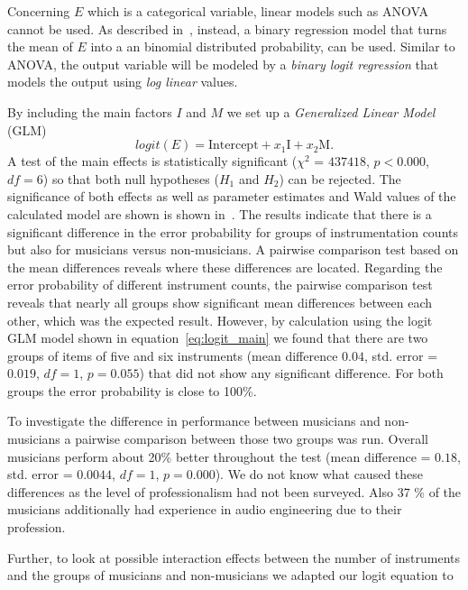 \par
Concerning $E$ which is a categorical variable, linear models such as ANOVA cannot be used.
As described in~\cite{jaeger08}, instead, a binary regression model that turns the mean of $E$ into a an binomial distributed probability, can be used.
Similar to ANOVA, the output variable will be modeled by a \emph{binary logit regression} that models the output using \emph{log linear} values.
\par
By including the main factors $I$ and $M$ we set up a \emph{Generalized Linear Model} (GLM)
\begin{equation}
	logit(E) =  \text{Intercept} + x_1 \text{I} + x_2 \text{M} .
	\label{eq:logit_main}
\end{equation}
A test of the main effects is statistically significant ($\chi^2$ = $437418$, $p < 0.000$, $df = 6$) so that both null hypotheses ($H_1$ and $H_2$) can be rejected. The significance of both effects as well as parameter estimates and Wald values of the calculated model are shown is shown in~\cite{stoeter13}.
The results indicate that there is a significant difference in the error probability for groups of instrumentation counts but also for musicians versus non-musicians. A pairwise comparison test based on the mean differences reveals where these differences are located. Regarding the error probability of different instrument counts, the pairwise comparison test reveals that nearly all groups show significant mean differences between each other, which was the expected result. However, by calculation using the logit GLM model shown in equation~\ref{eq:logit_main} we found that there are two groups of items of five and six instruments (mean difference $0.04$, std. error = $0.019$, $df = 1$, $p = 0.055$) that did not show any significant difference. For both groups the error probability is close to 100\%.
\par
To investigate the difference in performance between musicians and non-musicians a pairwise comparison between those two groups was run. Overall musicians perform about 20\% better throughout the test (mean difference = $0.18$, std. error = $ 0.0044$, $df = 1$, $p=0.000$). We do not know what caused these differences as the level of professionalism had not been surveyed. Also 37 \% of the musicians additionally had experience in audio engineering due to their profession.
\par
Further, to look at possible interaction effects between the number of instruments and the groups of musicians and non-musicians we adapted our logit equation to
